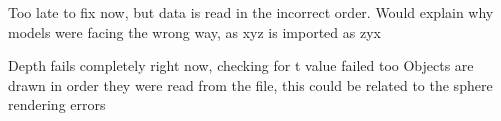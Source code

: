 
\begin{DoxyRefList}
\item[\label{bug__bug000002}%
\hypertarget{bug__bug000002}{}%
Member \hyperlink{namespaceRenderer_aa6ee81d879eb80bd4242817e9052b9bc}{Renderer\+:\+:pop\+First\+Item} (std\+::deque$<$ T $>$ \&\+\_\+items)]Too late to fix now, but data is read in the incorrect order. Would explain why models were facing the wrong way, as xyz is imported as zyx  
\item[\label{bug__bug000001}%
\hypertarget{bug__bug000001}{}%
Member \hyperlink{namespaceRenderer_ac12ecacae721953493f903dacb4d411a}{Renderer\+:\+:trace} (const \hyperlink{structRenderer_1_1Ray}{Ray} \&\+\_\+ray, \hyperlink{structRenderer_1_1RenderContext}{Render\+Context} $\ast$\+\_\+context)]Depth fails completely right now, checking for t value failed too Objects are drawn in order they were read from the file, this could be related to the sphere rendering errors 
\end{DoxyRefList}